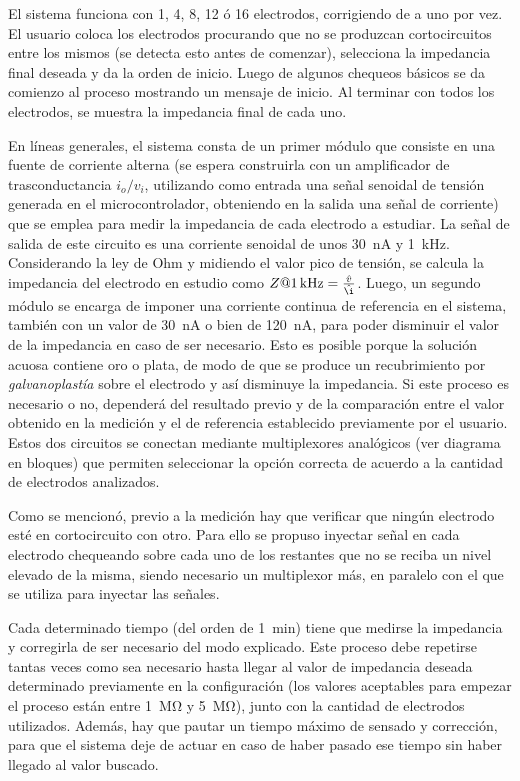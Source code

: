 El sistema funciona con 1, 4, 8, 12 ó 16 electrodos, corrigiendo de a uno por vez. El usuario coloca los electrodos procurando que no se produzcan cortocircuitos entre los mismos (se detecta esto antes de comenzar), selecciona la impedancia final deseada y da la orden de inicio. Luego de algunos chequeos básicos se da comienzo al proceso mostrando un mensaje de inicio. Al terminar con todos los electrodos, se muestra la impedancia final de cada uno. 

En líneas generales, el sistema consta de un primer módulo que consiste en una fuente de corriente alterna (se espera construirla con un amplificador de trasconductancia $i_o/v_i$, utilizando como entrada una señal senoidal de tensión generada en el microcontrolador, obteniendo en la salida una señal de corriente) que se emplea para medir la impedancia de cada electrodo a estudiar. La señal de salida de este circuito es una corriente senoidal de unos \SI{30}{\nano\ampere} y \SI{1}{\kilo\hertz}. Considerando la ley de Ohm y midiendo el valor pico de tensión, se calcula la impedancia del electrodo en estudio como $Z@\SI{1}{\kilo\hertz} = \frac{\hat{v}}{\hat{\i}}$. Luego, un segundo módulo se encarga de imponer una corriente continua de referencia en el sistema, también con un valor de \SI{30}{\nano\ampere} o bien de \SI{120}{\nano\ampere}, para poder disminuir el valor de la impedancia en caso de ser necesario. Esto es posible porque la solución acuosa contiene oro o plata, de modo de que se produce un recubrimiento por \emph{galvanoplastía} sobre el electrodo y así disminuye la impedancia. Si este proceso es necesario o no, dependerá del resultado previo y de la comparación entre el valor obtenido en la medición y el de referencia establecido previamente por el usuario. Estos dos circuitos se conectan mediante multiplexores analógicos (ver diagrama en bloques) que permiten seleccionar la opción correcta de acuerdo a la cantidad de electrodos analizados. 

Como se mencionó, previo a la medición hay que verificar que ningún electrodo esté en cortocircuito con otro. Para ello se propuso inyectar señal en cada electrodo chequeando sobre cada uno de los restantes que no se reciba un nivel elevado de la misma, siendo necesario un multiplexor más, en paralelo con el que se utiliza para inyectar las señales.

Cada determinado tiempo (del orden de \SI{1}{\minute}) tiene que medirse la impedancia y corregirla de ser necesario del modo explicado. Este proceso debe repetirse tantas veces como sea necesario hasta llegar al valor de impedancia deseada determinado previamente en la configuración (los valores aceptables para empezar el proceso están entre \SI{1}{\mega\ohm} y \SI{5}{\mega\ohm}), junto con la cantidad de electrodos utilizados. Además, hay que pautar un tiempo máximo de sensado y corrección, para que el sistema deje de actuar en caso de haber pasado ese tiempo sin haber llegado al valor buscado.



